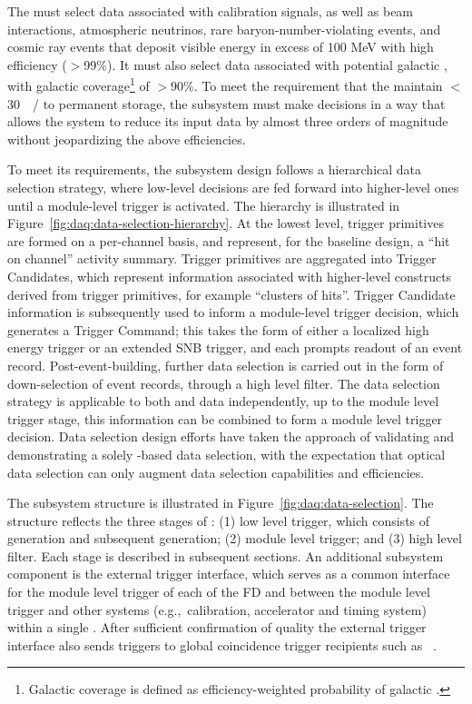 The  must select data associated with calibration signals, as well
as beam interactions, atmospheric neutrinos, rare baryon-number-violating
events, and cosmic ray events that deposit visible energy in excess of 100 MeV
with high efficiency ($>$99\%). 
It must also select data associated with potential galactic , with
galactic coverage\footnote{Galactic coverage is defined as efficiency-weighted
  probability of galactic .} of $>$90\%.
To meet the requirement that the   maintain
$<$\SI{30}{\peta\byte/\year} to permanent storage, the  subsystem
must make  decisions in a way that allows the  system
to reduce its input data by almost three orders of magnitude 
without jeopardizing
the above efficiencies.

To meet its requirements, the  subsystem design follows a
hierarchical data selection strategy, where low-level decisions are fed forward
into higher-level ones until a module-level trigger is activated. 
The hierarchy is illustrated in Figure~\ref{fig:daq:data-selection-hierarchy}. 
At the lowest level, trigger primitives are formed on a per-channel basis, and
represent, for the baseline design, a ``hit on channel'' activity summary.
Trigger primitives are aggregated into Trigger Candidates, which represent
information associated with higher-level constructs derived from trigger
primitives, for example ``clusters of hits''.
Trigger Candidate information is subsequently used to inform a module-level
trigger decision, which generates a Trigger Command; this takes the form of
either a localized high energy trigger or an extended SNB trigger, and each
prompts readout of an event record.
Post-event-building, further data selection is carried out in the form of
down-selection of event records, through a high level filter.
The data selection strategy is applicable to both  and 
data independently, up to the module level trigger stage, this information can
be combined to form a module level trigger decision.
Data selection design efforts have taken the approach of validating and
demonstrating a solely -based data selection, with the expectation that
optical data selection can only augment data selection capabilities and efficiencies.

The subsystem structure is illustrated in Figure~\ref{fig:daq:data-selection}.
The structure reflects the three stages of : (1) low level
trigger, which consists of  generation and subsequent
 generation; (2) module level trigger; and (3) high level
filter.
Each stage is described in subsequent sections.
An additional subsystem component is the external trigger interface, which
serves as a common interface for the module level trigger of each of the FD
 and between the module level trigger and other systems
(e.g.,~calibration, accelerator and timing system) within a single
.
After sufficient confirmation of quality the external trigger interface also
sends  triggers to global coincidence trigger recipients such as
~\cite{snews}.

